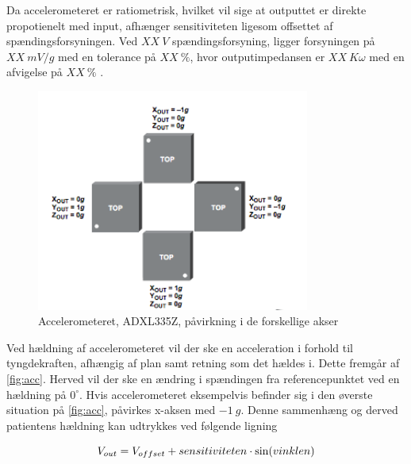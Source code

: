 Da accelerometeret er ratiometrisk, hvilket vil sige at outputtet er direkte propotienelt med input, afhænger sensitiviteten ligesom offsettet af spændingsforsyningen. Ved $XX~V$ spændingsforsyning, ligger forsyningen på $XX~mV/g$ med en tolerance på $XX~\%$, hvor outputimpedansen er $XX~K\omega$ med en afvigelse på $XX~\%$ \citep{analogdevices2010}. 

\begin{figure}[H]
\centering
\includegraphics[width=0.8\textwidth]{figures/acc.png}
\caption{Accelerometeret, ADXL335Z, påvirkning i de forskellige akser}
\label{fig:acc}
\end{figure}

\noindent
Ved hældning af accelerometeret vil der ske en acceleration i forhold til tyngdekraften, afhængig af plan samt retning som det hældes i. Dette fremgår af \autoref{fig:acc}. Herved vil der ske en ændring i spændingen fra referencepunktet ved en hældning på $0^{\circ}$. Hvis accelerometeret eksempelvis befinder sig i den øverste situation på \autoref{fig:acc}, påvirkes x-aksen med $-1~g$. Denne sammenhæng og derved patientens hældning kan udtrykkes ved følgende ligning \citep{Cliford2005}

\begin{equation} \label{equ:vinkler}
	V_{out} = V_{offset} + sensitiviteten \cdot \sin(vinklen) \\
\end{equation}


